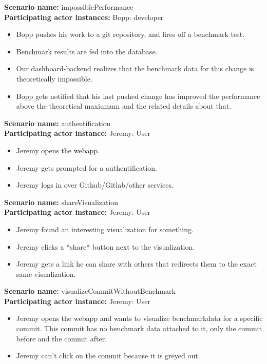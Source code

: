 \documentclass[parskip=full,11pt]{scrartcl}
\begin{document}
\textbf{Scenario name:} impossiblePerformance \\
\textbf{Participating actor instances:} Bopp: \gls{developer}
\begin{itemize}
	\item Bopp pushes his work to a git repository, and fires off a benchmark test.
	\item Benchmark results are fed into the database.
	\item Our dashboard-backend realizes that the benchmark data for this change is theoretically impossible.
	\item Bopp gets notified that his last pushed change has improved the performance above the theoretical maxiumum and the related details about that.
\end{itemize}

\textbf{Scenario name:} authentification \\
\textbf{Participating actor instance:} Jeremy: User
\begin{itemize}
	\item Jeremy opens the webapp.
	\item Jeremy gets prompted for a authentification.
	\item Jeremy logs in over Github/Gitlab/other services.
\end{itemize}

\textbf{Scenario name:} shareVisualization \\
\textbf{Participating actor instance:} Jeremy: User
\begin{itemize}
	\item Jeremy found an interesting visualization for something.
	\item Jeremy clicks a *share* button next to the visualization.
	\item Jeremy gets a link he can share with others that redirects them to the exact same visualization.
\end{itemize}

\textbf{Scenario name:} visualizeCommitWithoutBenchmark\\
\textbf{Participating actor instance:} Jeremy: User
\begin{itemize}
	\item Jeremy opens the webapp and wants to visualize benchmarkdata for a specific commit. This commit has no benchmark data attached to it, only the commit before and the commit after.
	\item Jeremy can't click on the commit because it is greyed out.
\end{itemize}
\end{document}
